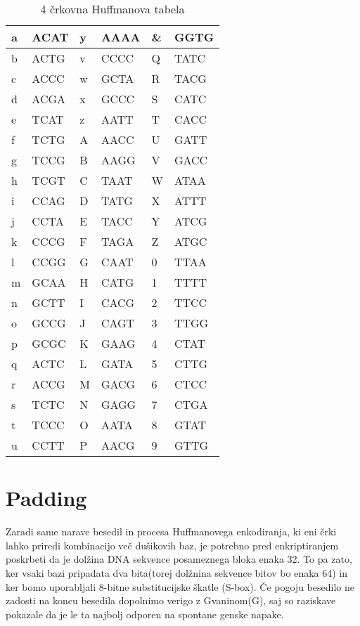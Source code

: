 \documentclass[graybox, envcountchap]{svmult}
\begin{document}
\begin{table}[!ht]
    \centering
    \begin{tabular}{|l|l|l|l|l|l|}
    \hline
        a & ACAT & y & AAAA & \& & GGTG \\ \hline
        b & ACTG & v & CCCC & Q & TATC \\ \hline
        c & ACCC & w & GCTA & R & TACG \\ \hline
        d & ACGA & x & GCCC & S & CATC \\ \hline
        e & TCAT & z & AATT & T & CACC \\ \hline
        f & TCTG & A & AACC & U & GATT \\ \hline
        g & TCCG & B & AAGG & V & GACC \\ \hline
        h & TCGT & C & TAAT & W & ATAA \\ \hline
        i & CCAG & D & TATG & X & ATTT \\ \hline
        j & CCTA & E & TACC & Y & ATCG \\ \hline
        k & CCCG & F & TAGA & Z & ATGC \\ \hline
        l & CCGG & G & CAAT & 0 & TTAA \\ \hline
        m & GCAA & H & CATG & 1 & TTTT \\ \hline
        n & GCTT & I & CACG & 2 & TTCC \\ \hline
        o & GCCG & J & CAGT & 3 & TTGG \\ \hline
        p & GCGC & K & GAAG & 4 & CTAT \\ \hline
        q & ACTC & L & GATA & 5 & CTTG \\ \hline
        r & ACCG & M & GACG & 6 & CTCC \\ \hline
        s & TCTC & N & GAGG & 7 & CTGA \\ \hline
        t & TCCC & O & AATA & 8 & GTAT \\ \hline
        u & CCTT & P & AACG & 9 & GTTG \\ \hline
    \end{tabular}
    \caption{4 črkovna Huffmanova tabela}
    \label{stiricrkovna}
    \raggedleft
\end{table}

\section{Padding}
Zaradi same narave besedil in procesa Huffmanovega enkodiranja, ki eni črki lahko priredi kombinacijo več dušikovih baz, je potrebno pred enkriptiranjem poskrbeti da je dolžina DNA sekvence posameznega bloka enaka 32. To pa zato, ker vsaki bazi pripadata dva bita(torej dolžnina sekvence bitov bo enaka 64) in ker bomo uporabljali 8-bitne substitucijske škatle (S-box). Če pogoju besedilo ne zadosti na koncu besedila dopolnimo verigo z Gvaninom(G), saj so raziskave pokazale da je le ta najbolj odporen na spontane genske napake.
\end{document}
